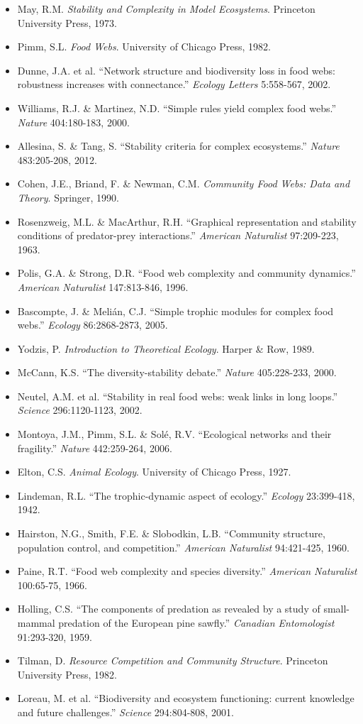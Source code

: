 \documentclass[a4paper, 11pt]{article}
\begin{document}
\begin{itemize}
\item May, R.M. \textit{Stability and Complexity in Model Ecosystems}. Princeton University Press, 1973.
\item Pimm, S.L. \textit{Food Webs}. University of Chicago Press, 1982.
\item Dunne, J.A. et al. ``Network structure and biodiversity loss in food webs: robustness increases with connectance.'' \textit{Ecology Letters} 5:558-567, 2002.
\item Williams, R.J. \& Martinez, N.D. ``Simple rules yield complex food webs.'' \textit{Nature} 404:180-183, 2000.
\item Allesina, S. \& Tang, S. ``Stability criteria for complex ecosystems.'' \textit{Nature} 483:205-208, 2012.
\item Cohen, J.E., Briand, F. \& Newman, C.M. \textit{Community Food Webs: Data and Theory}. Springer, 1990.
\item Rosenzweig, M.L. \& MacArthur, R.H. ``Graphical representation and stability conditions of predator-prey interactions.'' \textit{American Naturalist} 97:209-223, 1963.
\item Polis, G.A. \& Strong, D.R. ``Food web complexity and community dynamics.'' \textit{American Naturalist} 147:813-846, 1996.
\item Bascompte, J. \& Melián, C.J. ``Simple trophic modules for complex food webs.'' \textit{Ecology} 86:2868-2873, 2005.
\item Yodzis, P. \textit{Introduction to Theoretical Ecology}. Harper \& Row, 1989.
\item McCann, K.S. ``The diversity-stability debate.'' \textit{Nature} 405:228-233, 2000.
\item Neutel, A.M. et al. ``Stability in real food webs: weak links in long loops.'' \textit{Science} 296:1120-1123, 2002.
\item Montoya, J.M., Pimm, S.L. \& Solé, R.V. ``Ecological networks and their fragility.'' \textit{Nature} 442:259-264, 2006.
\item Elton, C.S. \textit{Animal Ecology}. University of Chicago Press, 1927.
\item Lindeman, R.L. ``The trophic-dynamic aspect of ecology.'' \textit{Ecology} 23:399-418, 1942.
\item Hairston, N.G., Smith, F.E. \& Slobodkin, L.B. ``Community structure, population control, and competition.'' \textit{American Naturalist} 94:421-425, 1960.
\item Paine, R.T. ``Food web complexity and species diversity.'' \textit{American Naturalist} 100:65-75, 1966.
\item Holling, C.S. ``The components of predation as revealed by a study of small-mammal predation of the European pine sawfly.'' \textit{Canadian Entomologist} 91:293-320, 1959.
\item Tilman, D. \textit{Resource Competition and Community Structure}. Princeton University Press, 1982.
\item Loreau, M. et al. ``Biodiversity and ecosystem functioning: current knowledge and future challenges.'' \textit{Science} 294:804-808, 2001.
\end{itemize}
\end{document}

